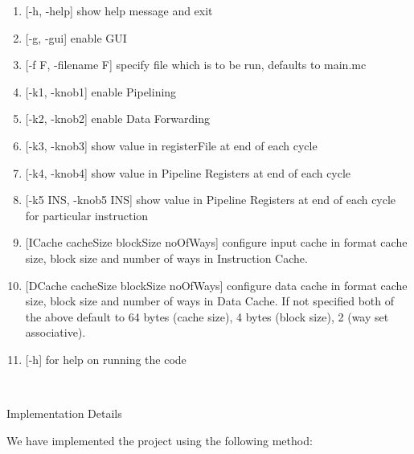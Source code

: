 \documentclass{article}
\begin{document}
\begin{enumerate}

  \item {[-h, -help]}        show help message and exit
  \item {[-g, -gui]}           enable GUI
  \item {[-f F, -filename F]}  specify file which is to be run, defaults to main.mc
  \item {[-k1, -knob1]}        enable Pipelining
  \item {[-k2, -knob2]}        enable Data Forwarding
  \item {[-k3, -knob3]}        show value in registerFile at end of each cycle
  \item {[-k4, -knob4]}        show value in Pipeline Registers at end of each cycle
  \item {[-k5 INS, -knob5 INS]}  show value in Pipeline Registers at end of each cycle for particular instruction
  \item {[ICache cacheSize blockSize noOfWays]} configure input cache in format cache size, block size and number of ways in Instruction Cache.
  \item {[DCache cacheSize blockSize noOfWays]} configure data cache in format cache size, block size and number of ways in Data Cache. If not specified both of the above default to 64 bytes (cache size), 4 bytes (block size), 2 (way set associative).
  \item {[-h]} for help on running the code
\end{enumerate}
\\
\newpage
\begin{centering}
\begin{Huge}
\textsf{Implementation Details}\\
\end{Huge}
\end{centering}
\protect\vspace{1.0cm}
We have implemented the project using the following method:\\
\end{document}
